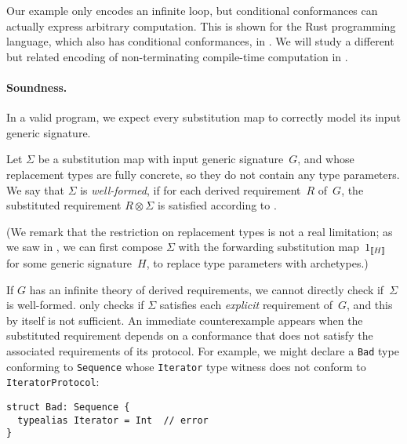 \documentclass[../generics]{subfiles}
\begin{document}
Our example only encodes an infinite loop, but conditional conformances can actually express arbitrary computation. This is shown for the Rust programming language, which also has conditional conformances, in \cite{rustturing}. We will study a different but related encoding of non-terminating compile-time computation in .

\paragraph{Soundness.}
In a valid program, we expect every substitution map to correctly model its input generic signature.
\begin{definition}\label{valid subst map}
Let $\Sigma$ be a substitution map with input generic signature~$G$, and whose replacement types are fully concrete, so they do not contain any type parameters. We say that $\Sigma$ is \emph{well-formed}, if for each derived requirement~$R$ of~$G$, the substituted requirement $R\otimes\Sigma$ is satisfied according to .

(We remark that the restriction on replacement types is not a real limitation; as we saw in , we can first compose $\Sigma$ with the forwarding substitution map~$1_{[\![H]\!]}$ for some generic signature~$H$, to replace type parameters with archetypes.)
\end{definition}

If $G$ has an infinite theory of derived requirements, we cannot directly check if~$\Sigma$ is well-formed.  only checks if $\Sigma$ satisfies each \emph{explicit} requirement of~$G$, and this by itself is not sufficient. An immediate counterexample appears when the substituted requirement depends on a conformance that does not satisfy the associated requirements of its protocol. For example, we might declare a \texttt{Bad} type conforming to \texttt{Sequence} whose \texttt{Iterator} type witness does not conform to \texttt{IteratorProtocol}:
\begin{Verbatim}
struct Bad: Sequence {
  typealias Iterator = Int  // error
}
\end{Verbatim}
\end{document}
